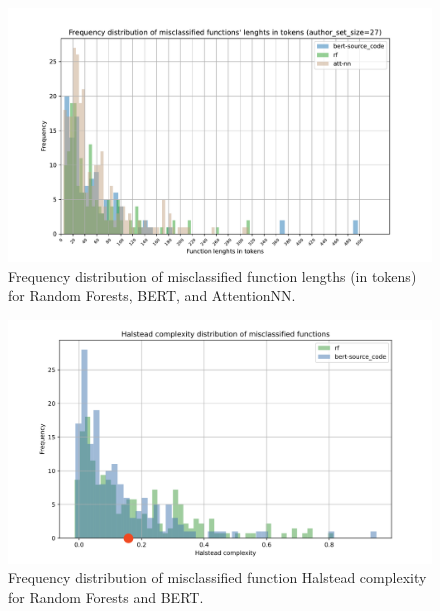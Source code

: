 \documentclass[conference]{IEEEtran}
\begin{document}
\begin{figure}[!b]
    \centering
    \hspace*{-25pt}\includegraphics[width=1.2\columnwidth]{figures/misclass_lens.pdf}
    \caption{Frequency distribution of misclassified function lengths (in tokens) for Random Forests, BERT, and AttentionNN.}
    \label{fig:misclass_lens}
\end{figure}




\begin{figure}[!b]
    \centering
    \hspace*{-25pt}\includegraphics[width=1.2\columnwidth]{figures/misclass_hs.png}
    \caption{Frequency distribution of misclassified function Halstead complexity for Random Forests and BERT.}
    \label{fig:misclass_halstead}
\end{figure}
\end{document}
